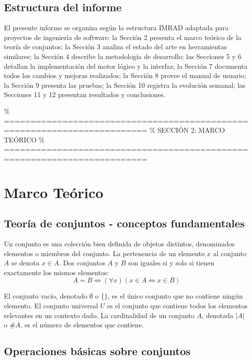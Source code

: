 \documentclass[11pt,a4paper]{article}
\begin{document}
\subsection{Estructura del informe}
El presente informe se organiza según la estructura IMRAD adaptada para proyectos de ingeniería de software: la Sección 2 presenta el marco teórico de la teoría de conjuntos; la Sección 3 analiza el estado del arte en herramientas similares; la Sección 4 describe la metodología de desarrollo; las Secciones 5 y 6 detallan la implementación del motor lógico y la interfaz; la Sección 7 documenta todos los cambios y mejoras realizados; la Sección 8 provee el manual de usuario; la Sección 9 presenta las pruebas; la Sección 10 registra la evolución semanal; las Secciones 11 y 12 presentan resultados y conclusiones.

\newpage

\% =========================================================================
\% SECCIÓN 2: MARCO TEÓRICO
\% =========================================================================
\section{Marco Teórico}

\subsection{Teoría de conjuntos - conceptos fundamentales}
Un conjunto es una colección bien definida de objetos distintos, denominados elementos o miembros del conjunto. La pertenencia de un elemento $x$ al conjunto $A$ se denota $x \in A$. Dos conjuntos $A$ y $B$ son iguales si y solo si tienen exactamente los mismos elementos:
\begin{equation}
A = B \iff (\forall x)(x \in A \iff x \in B)
\end{equation}

El conjunto vacío, denotado $\emptyset$ o $\{\}$, es el único conjunto que no contiene ningún elemento. El conjunto universal $U$ es el conjunto que contiene todos los elementos relevantes en un contexto dado. La cardinalidad de un conjunto $A$, denotada $|A|$ o $\#A$, es el número de elementos que contiene.

\subsection{Operaciones básicas sobre conjuntos}
\end{document}
